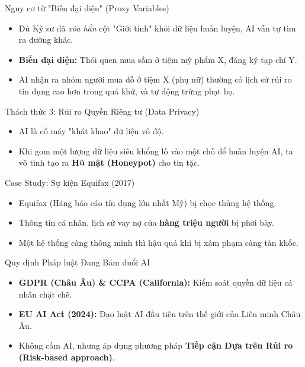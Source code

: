 \documentclass[aspectratio=169,12pt]{beamer}
\begin{document}
\begin{frame}{Nguy cơ từ "Biến đại diện" (Proxy Variables)}
    \begin{itemize}
        \item Dù Kỹ sư đã \textit{xóa hẳn} cột "Giới tính" khỏi dữ liệu huấn luyện, AI vẫn tự tìm ra đường khác.
        \item \textbf{Biến đại diện:} Thói quen mua sắm ở tiệm mỹ phẩm X, đăng ký tạp chí Y.
        \item AI nhận ra nhóm người mua đồ ở tiệm X (phụ nữ) thường có lịch sử rủi ro tín dụng cao hơn trong quá khứ, và tự động trừng phạt họ.
    \end{itemize}
\end{frame}

\begin{frame}{Thách thức 3: Rủi ro Quyền Riêng tư (Data Privacy)}
    \begin{itemize}
        \item AI là cỗ máy "khát khao" dữ liệu vô độ.
        \item Khi gom một lượng dữ liệu siêu khổng lồ vào một chỗ để huấn luyện AI, ta vô tình tạo ra \textbf{Hũ mật (Honeypot)} cho tin tặc.
    \end{itemize}
\end{frame}

\begin{frame}{Case Study: Sự kiện Equifax (2017)}
    \begin{itemize}
        \item Equifax (Hãng báo cáo tín dụng lớn nhất Mỹ) bị chọc thủng hệ thống.
        \item Thông tin cá nhân, lịch sử vay nợ của \textbf{hàng triệu người} bị phơi bày.
        \item Một hệ thống càng thông minh thì hậu quả khi bị xâm phạm càng tàn khốc.
    \end{itemize}
\end{frame}

\begin{frame}{Quy định Pháp luật Đang Bám đuổi AI}
    \begin{itemize}
        \item \textbf{GDPR (Châu Âu) \& CCPA (California):} Kiểm soát quyền dữ liệu cá nhân chặt chẽ.
        \item \textbf{EU AI Act (2024):} Đạo luật AI đầu tiên trên thế giới của Liên minh Châu Âu.
        \item Không cấm AI, nhưng áp dụng phương pháp \textbf{Tiếp cận Dựa trên Rủi ro (Risk-based approach)}.
    \end{itemize}
\end{frame}
\end{document}
